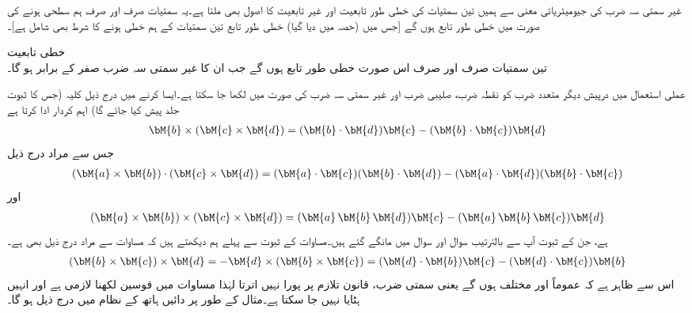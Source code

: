 غیر سمتی سہ ضرب کی جیومیٹریائی معنی سے ہمیں تین سمتیات کی خطی طور تابعیت اور غیر تابعیت کا اصول بھی ملتا ہے۔یہ سمتیات صرف اور صرف ہم سطحی ہونے کی صورت میں خطی طور تابع ہوں گے [جس میں (حصہ  میں دیا گیا) خطی طور تابع تین سمتیات کے ہم خطی ہونے کا شرط بھی شامل ہے]۔

\quad خطی تابعیت\\
تین سمتیات صرف اور صرف اس صورت خطی طور تابع ہوں گے جب ان کا غیر سمتی سہ ضرب صفر کے برابر ہو گا۔

عملی استعمال میں درپیش دیگر متعدد ضرب کو نقطہ ضرب، صلیبی ضرب اور غیر سمتی سہ ضرب کی صورت میں لکھا جا سکتا ہے۔ایسا کرنے میں درج ذیل کلیہ (جس کا ثبوت جلد پیش کیا جائے گا) اہم کردار ادا کرتا ہے
\begin{align}\label{مساوات_الجبرا_خطیت_اور_حجم_الف}
\bM{b}\times (\bM{c}\times \bM{d})=(\bM{b}\cdot \bM{d})\bM{c}-(\bM{b}\cdot\bM{c})\bM{d}
\end{align}
جس سے مراد درج ذیل  
\begin{align}\label{مساوات_الجبرا_خطیت_اور_حجم_ب}
(\bM{a}\times \bM{b})\cdot(\bM{c}\times\bM{d})=(\bM{a}\cdot\bM{c})(\bM{b}\cdot\bM{d})-(\bM{a}\cdot\bM{d})(\bM{b}\cdot\bM{c})
\end{align}
اور
\begin{align}\label{مساوات_الجبرا_خطیت_اور_حجم_پ}
(\bM{a}\times \bM{b})\times(\bM{c}\times\bM{d})=(\bM{a}\,\bM{b}\,\bM{d})\bM{c}-(\bM{a}\,\bM{b}\,\bM{c})\bM{d}
\end{align}
ہے، جن کے ثبوت آپ سے بالترتیب سوال  اور سوال  میں مانگے گئے ہیں۔مساوات   کے ثبوت سے پہلے ہم دیکھتے ہیں کہ مساوات  سے مراد درج ذیل بھی ہے۔
\begin{align*}
(\bM{b}\times \bM{c})\times \bM{d}=-\bM{d}\times (\bM{b}\times \bM{c})=(\bM{d}\cdot \bM{b})\bM{c}-(\bM{d}\cdot\bM{c})\bM{b}
\end{align*}
اس سے ظاہر ہے کہ عموماً  اور  مختلف ہوں گے یعنی سمتی ضرب،  قانون تلازم پر پورا نہیں اترتا لہٰذا مساوات  میں قوسین لکھنا لازمی ہے اور انہیں ہٹایا نہیں جا سکتا ہے۔مثال کے طور پر دائیں ہاتھ کے نظام میں درج ذیل ہو گا۔
